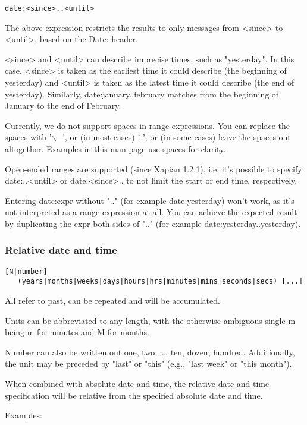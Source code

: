 \documentclass[a4,onecolumn,portrait]{article}
\begin{document}
\begin{verbatim}
date:<since>..<until>
\end{verbatim}

The above expression restricts the results to only messages from <since> to <until>, based on the Date: header.

<since> and <until> can describe imprecise times, such as "yesterday". In this case, <since> is taken as the earliest time it could describe (the beginning of yesterday) and <until> is taken as the latest time it could describe (the end of yesterday).  Similarly, date:january..february matches from the beginning of January to the end of February.

Currently, we do not support spaces in range expressions. You can replace the spaces with '$\backslash$\_', or (in most cases) '-', or (in some cases) leave the spaces out altogether. Examples in this man page use spaces for clarity.

Open-ended ranges are supported (since Xapian 1.2.1), i.e. it's possible to specify date:..<until> or date:<since>.. to not limit the start or end time, respectively.

Entering date:expr without ".." (for example date:yesterday) won't work, as it's not interpreted as a range expression at all. You can achieve the expected result by duplicating the expr both sides of ".." (for example date:yesterday..yesterday).
\subsubsection{Relative date and time}
\label{sec-7-3-2}

\begin{verbatim}
[N|number]
   (years|months|weeks|days|hours|hrs|minutes|mins|seconds|secs) [...]
\end{verbatim}

All refer to past, can be repeated and will be accumulated.

Units can be abbreviated to any length, with the otherwise ambiguous single m being m for minutes and M for months.

Number can also be written out one, two, \ldots{}, ten, dozen, hundred.  Additionally, the unit may be preceded by "last" or "this" (e.g., "last week" or "this month").

When combined with absolute date and time, the relative date and time specification will be relative from the specified absolute date and time.

Examples:
\end{document}
